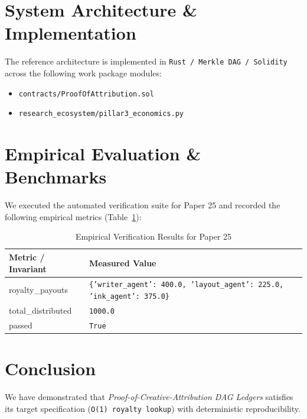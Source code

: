 \documentclass[10pt,twocolumn]{article}
\begin{document}
\section{System Architecture \& Implementation}
The reference architecture is implemented in \texttt{Rust / Merkle DAG / Solidity} across the following work package modules:
\begin{itemize}
  \item \texttt{contracts/ProofOfAttribution.sol}
  \item \texttt{research\_ecosystem/pillar3\_economics.py}
\end{itemize}

\section{Empirical Evaluation \& Benchmarks}
We executed the automated verification suite for Paper 25 and recorded the following empirical metrics (Table~\ref{tab:metrics}):

\begin{table}[htbp]
\centering
\caption{Empirical Verification Results for Paper 25}
\label{tab:metrics}
\begin{tabular}{ll}
\toprule
\textbf{Metric / Invariant} & \textbf{Measured Value} \\
\midrule
    royalty\_payouts & \texttt{\{'writer\_agent': 400.0, 'layout\_agent': 225.0, 'ink\_agent': 375.0\}} \\
    total\_distributed & \texttt{1000.0} \\
    passed & \texttt{True} \\
\bottomrule
\end{tabular}
\end{table}

\section{Conclusion}
We have demonstrated that \textit{Proof-of-Creative-Attribution DAG Ledgers} satisfies its target specification (\texttt{O(1) royalty lookup}) with deterministic reproducibility.



\end{document}
